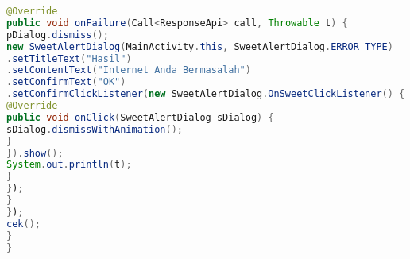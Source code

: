 \begin{lstlisting}[language=Java, caption=Implementasi Kelas Main, label=code:main, firstnumber=23]
@Override
public void onFailure(Call<ResponseApi> call, Throwable t) {
pDialog.dismiss();
new SweetAlertDialog(MainActivity.this, SweetAlertDialog.ERROR_TYPE)
.setTitleText("Hasil")
.setContentText("Internet Anda Bermasalah")
.setConfirmText("OK")
.setConfirmClickListener(new SweetAlertDialog.OnSweetClickListener() {
@Override
public void onClick(SweetAlertDialog sDialog) {
sDialog.dismissWithAnimation();
}
}).show();
System.out.println(t);
}
});
}
});
cek();
}
}
\end{lstlisting}